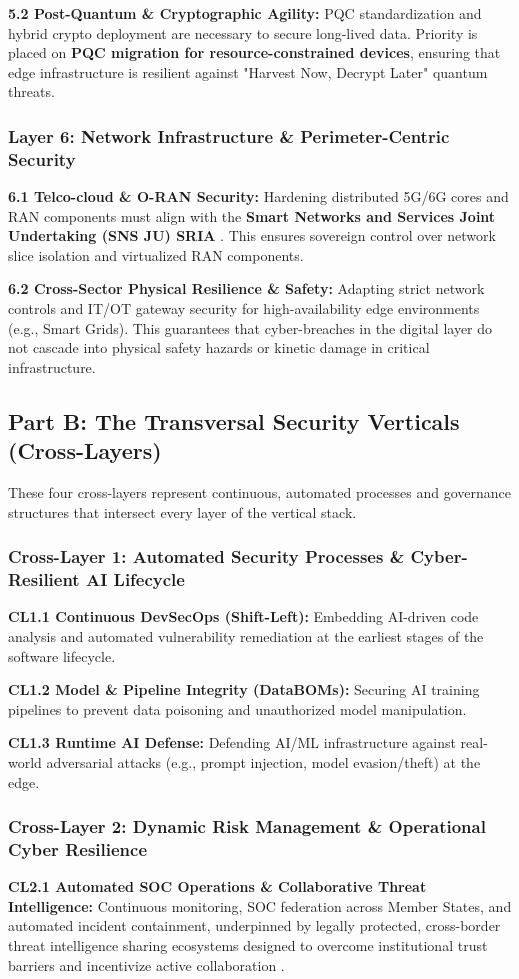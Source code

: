 \documentclass[12pt,a4paper]{article}
\begin{document}
\textbf{5.2 Post-Quantum \& Cryptographic Agility:} PQC standardization and hybrid crypto deployment are necessary to secure long-lived data. Priority is placed on \textbf{PQC migration for resource-constrained devices}, ensuring that edge infrastructure is resilient against "Harvest Now, Decrypt Later" quantum threats.

\subsubsection*{Layer 6: Network Infrastructure \& Perimeter-Centric Security}
\textbf{6.1 Telco-cloud \& O-RAN Security:} Hardening distributed 5G/6G cores and RAN components must align with the \textbf{Smart Networks and Services Joint Undertaking (SNS JU) SRIA} \cite{snsju}. This ensures sovereign control over network slice isolation and virtualized RAN components.

\textbf{6.2 Cross-Sector Physical Resilience \& Safety:} Adapting strict network controls and IT/OT gateway security for high-availability edge environments (e.g., Smart Grids). This guarantees that cyber-breaches in the digital layer do not cascade into physical safety hazards or kinetic damage in critical infrastructure.

\subsection*{Part B: The Transversal Security Verticals (Cross-Layers)}
These four cross-layers represent continuous, automated processes and governance structures that intersect every layer of the vertical stack.

\subsubsection*{Cross-Layer 1: Automated Security Processes \& Cyber-Resilient AI Lifecycle}
\textbf{CL1.1 Continuous DevSecOps (Shift-Left):} Embedding AI-driven code analysis and automated vulnerability remediation at the earliest stages of the software lifecycle.

\textbf{CL1.2 Model \& Pipeline Integrity (DataBOMs):} Securing AI training pipelines to prevent data poisoning and unauthorized model manipulation.

\textbf{CL1.3 Runtime AI Defense:} Defending AI/ML infrastructure against real-world adversarial attacks (e.g., prompt injection, model evasion/theft) at the edge.

\subsubsection*{Cross-Layer 2: Dynamic Risk Management \& Operational Cyber Resilience}
\textbf{CL2.1 Automated SOC Operations \& Collaborative Threat Intelligence:} Continuous monitoring, SOC federation across Member States, and automated incident containment, underpinned by legally protected, cross-border threat intelligence sharing ecosystems designed to overcome institutional trust barriers and incentivize active collaboration \cite{concordia}.
\end{document}
